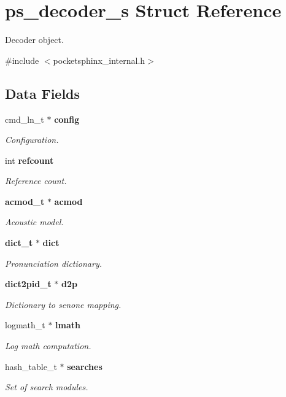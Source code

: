 \section{ps\-\_\-decoder\-\_\-s Struct Reference}
\label{structps__decoder__s}


Decoder object.  




{\ttfamily \#include $<$pocketsphinx\-\_\-internal.\-h$>$}

\subsection*{Data Fields}
\begin{DoxyCompactItemize}
\item 
cmd\-\_\-ln\-\_\-t $\ast$ {\bf config}
\begin{DoxyCompactList}\small\item\em Configuration. \end{DoxyCompactList}\item 
int {\bf refcount}
\begin{DoxyCompactList}\small\item\em Reference count. \end{DoxyCompactList}\item 
{\bf acmod\-\_\-t} $\ast$ {\bf acmod}
\begin{DoxyCompactList}\small\item\em Acoustic model. \end{DoxyCompactList}\item 
{\bf dict\-\_\-t} $\ast$ {\bf dict}
\begin{DoxyCompactList}\small\item\em Pronunciation dictionary. \end{DoxyCompactList}\item 
{\bf dict2pid\-\_\-t} $\ast$ {\bf d2p}
\begin{DoxyCompactList}\small\item\em Dictionary to senone mapping. \end{DoxyCompactList}\item 
logmath\-\_\-t $\ast$ {\bf lmath}
\begin{DoxyCompactList}\small\item\em Log math computation. \end{DoxyCompactList}\item 
hash\-\_\-table\-\_\-t $\ast$ {\bf searches}
\begin{DoxyCompactList}\small\item\em Set of search modules. \end{DoxyCompactList}\item 

\end{DoxyCompactItemize}
